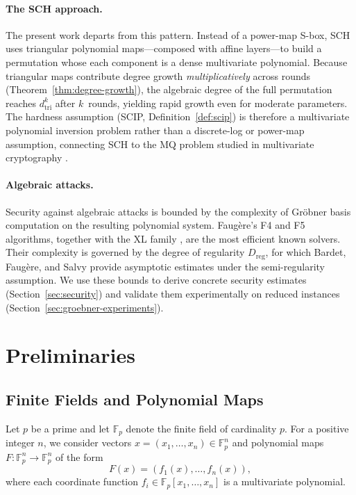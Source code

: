 ﻿\documentclass[english]{aucmcs}
\newcommand{\Fp}{\mathbb{F}_p}
\begin{document}
\paragraph{The SCH approach.}
The present work departs from this pattern.  Instead of a power-map
S-box, SCH uses triangular polynomial maps---composed with affine
layers---to build a permutation whose each component is a dense
multivariate polynomial.  Because triangular maps contribute degree
growth \emph{multiplicatively} across rounds (Theorem~\ref{thm:degree-growth}),
the algebraic degree of the full permutation reaches $d_{\mathrm{tri}}^k$
after $k$~rounds, yielding rapid growth even for moderate parameters.
The hardness assumption (SCIP, Definition~\ref{def:scip}) is therefore
a multivariate polynomial inversion problem rather than a discrete-log
or power-map assumption, connecting SCH to the MQ problem studied
in multivariate cryptography \cite{MQSurvey}.

\paragraph{Algebraic attacks.}
Security against algebraic attacks is bounded by the complexity of
Gr\"obner basis computation on the resulting polynomial system.
Faug\`ere's F4 \cite{F4F5} and F5 \cite{F5} algorithms, together
with the XL family \cite{XL}, are the most efficient known solvers.
Their complexity is governed by the degree of regularity
$D_{\mathrm{reg}}$, for which Bardet, Faug\`ere, and Salvy
\cite{Bardet2005} provide asymptotic estimates under the
semi-regularity assumption.  We use these bounds to derive
concrete security estimates (Section~\ref{sec:security}) and
validate them experimentally on reduced instances
(Section~\ref{sec:groebner-experiments}).


\section{Preliminaries}
\label{sec:prelim}

\subsection{Finite Fields and Polynomial Maps}

Let $p$ be a prime and let $\Fp$ denote the finite field of cardinality $p$.
For a positive integer $n$, we consider vectors $x=(x_1,\ldots,x_n)\in \Fp^n$
and polynomial maps $F:\Fp^n\to \Fp^n$ of the form
\[
F(x) = (f_1(x), \ldots, f_n(x)),
\]
where each coordinate function $f_i \in \Fp[x_1, \ldots, x_n]$ is a multivariate polynomial.
\end{document}
